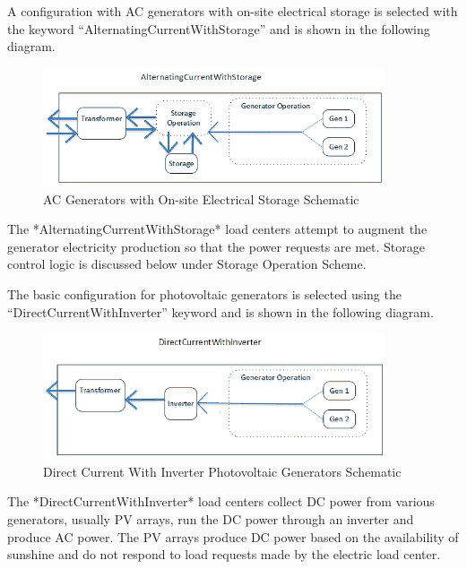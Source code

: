 A configuration with AC generators with on-site electrical storage is selected with the keyword “AlternatingCurrentWithStorage” and is shown in the following diagram. 

\begin{figure}[hbtp] %
\centering
\includegraphics[width=0.9\textwidth, height=0.9\textheight, keepaspectratio=true]{media/ACStorageBussDiagram.png}
\caption{AC Generators with On-site Electrical Storage Schematic \protect \label{fig:ac-generators-with-on-site-electrical-storage}}
\end{figure}

The *AlternatingCurrentWithStorage* load centers attempt to augment the generator electricity production so that the power requests are met. Storage control logic is discussed below under Storage Operation Scheme.

The basic configuration for photovoltaic generators is selected using the “DirectCurrentWithInverter” keyword and is shown in the following diagram.

\begin{figure}[hbtp] %
\centering
\includegraphics[width=0.9\textwidth, height=0.9\textheight, keepaspectratio=true]{media/DCInverterBussDiagram.png}
\caption{Direct Current With Inverter Photovoltaic Generators Schematic \protect \label{fig:direct-current-with-inverter-photovoltaic}}
\end{figure}

The *DirectCurrentWithInverter* load centers collect DC power from various generators, usually PV arrays, run the DC power through an inverter and produce AC power. The PV arrays produce DC power based on the availability of sunshine and do not respond to load requests made by the electric load center. 

